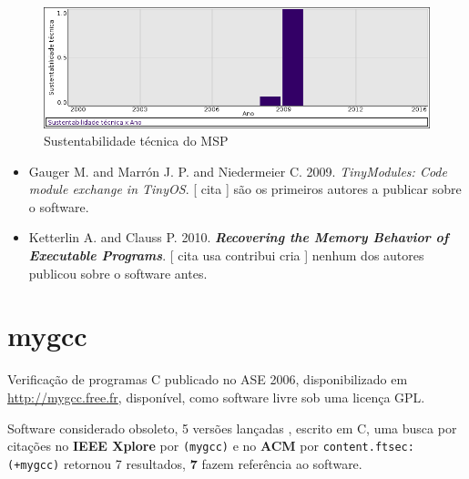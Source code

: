 \begin{figure}[h]
  \center
  \includegraphics[scale=0.50]{imagens/softwares-charts/msp.png}
  \caption{Sustentabilidade técnica do MSP}
\end{figure}


\begin{itemize}
\item Gauger M. and Marrón J. P. and Niedermeier C.
      2009.
        \textit{ TinyModules: Code module exchange in TinyOS}.
      [
          cita
      ]
são os primeiros autores a publicar sobre o software.
\item Ketterlin A. and Clauss P.
      2010.
        \textbf{\textit{ Recovering the Memory Behavior of Executable Programs}}.
      [
          cita
          usa
          contribui
          cria
      ]
nenhum dos autores publicou sobre o software antes.
\end{itemize}
\section{mygcc}

Verificação de programas C
publicado no ASE 2006,
disponibilizado em \url{http://mygcc.free.fr},
disponível,
como software livre
sob uma licença GPL.

Software considerado obsoleto,
5 versões lançadas
,
escrito em C,
uma busca por citações no {\bf IEEE Xplore} por
\texttt{(mygcc)}
e no {\bf ACM} por
\texttt{content.ftsec:(+mygcc)}
retornou
7 resultados,
{\bf 7} fazem referência ao software.


